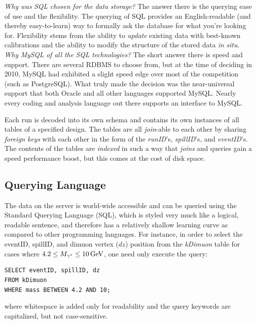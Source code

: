 \emph{Why was SQL chosen for the data storage?} The answer there is the querying ease of use and the flexibility. The querying of SQL provides an English-readable (and thereby easy-to-learn) way to formally ask the database for what you're looking for. Flexibility stems from the ability to \emph{update} existing data with best-known calibrations and the ability to modify the structure of the stored data \emph{in situ}. \emph{Why MySQL of all the SQL technologies?} The short answer there is speed and support. There are several RDBMS to choose from, but at the time of deciding in 2010, MySQL had exhibited a slight speed edge over most of the competition (such as PostgreSQL). What truly made the decision was the near-universal support that both Oracle and all other languages supported MySQL. Nearly every coding and analysis language out there supports an interface to MySQL.

Each run is decoded into its own schema and contains its own instances of all tables of a specified design. The tables are all \emph{join}-able to each other by sharing \emph{foreign keys} with each other in the form of the \emph{runID}'s, \emph{spillID}'s, and \emph{eventID}'s. The contents of the tables are \emph{indexed} in such a way that \emph{joins} and queries gain a speed performance boost, but this comes at the cost of disk space.

\subsection{Querying Language}

The data on the server is world-wide accessible and can be queried using the Standard Querying Language (SQL), which is styled very much like a logical, readable sentence, and therefore has a relatively shallow learning curve as compared to other programming languages. For instance, in order to select the eventID, spillID, and dimuon vertex ($dz$) position from the \emph{kDimuon} table for cases where $4.2 \leq M_{\gamma^*} \leq \unit[10]{GeV}$, one need only execute the query:
\begin{lstlisting}
SELECT eventID, spillID, dz
FROM kDimuon
WHERE mass BETWEEN 4.2 AND 10;
\end{lstlisting}
where whitespace is added only for readability and the query keywords are capitalized, but not case-sensitive.

